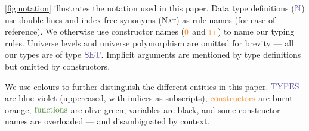 \documentclass[a4paper,UKenglish,cleveref,autoref,thm-restate,authorcolumns]{lipics-v2019}
\theoremstyle{definition}
\newcommand{\type}[1]{\textcolor{BlueViolet}{\operatorname{#1}}}
\newcommand{\constr}[1]{\textcolor{BurntOrange}{\operatorname{#1}}}
\newcommand{\func}[1]{\textcolor{OliveGreen}{\operatorname{#1}}}
\newcommand{\suc}{\constr{\scriptstyle 1+}}
\newcommand{\Set}{\type{SET}}
\newcommand{\N}{\type{\mathbb{N}}}
\begin{document}
\autoref{fig:notation} illustrates the notation used in this paper.
Data type definitions ($\type{\N}$) use double lines and index-free synonyms (\textsc{Nat}) as rule names (for ease of reference).
We otherwise use constructor names ($\constr{0}$ and $\suc$) to name our typing rules.
Universe levels and universe polymorphism are omitted for brevity --- all our types are of type $\Set$.
Implicit arguments are mentioned by type definitions but omitted by constructors.

We use colours to further distinguish the different entities in this paper.
$\type{TYPES}$ are blue violet (uppercased, with indices as subscripts), $\constr{constructors}$ are burnt orange, $\func{functions}$ are olive green, variables are black, and some constructor names are overloaded --- and disambiguated by context.

\end{document}
